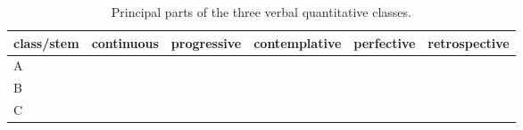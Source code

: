\begin{table}[htbp]
\footnotesize
\caption{Principal parts of the three verbal quantitative classes.}
\ifparadigmappendix\else\label{tab:verbal-quantity-classes}\fi
\begin{tabularx}{\textwidth}{L L L L L L}
\toprule
{\sc class/stem} & {\sc continuous} & {\sc progressive} & {\sc contemplative} & {\sc perfective} & {\sc retrospective} \\
\midrule
A  &  &  &  &  &  \\
B  &  &  &  &  &  \\
C  &  &  &  &  &  \\
\bottomrule
\end{tabularx}
\end{table}
